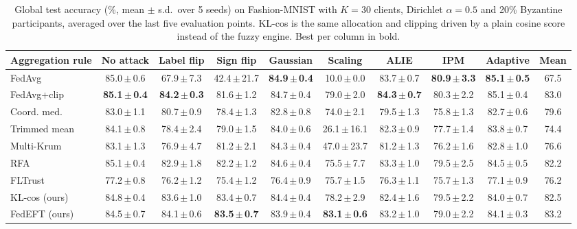 \begin{table}[!t]
\centering
\caption{Global test accuracy (\%, mean $\pm$ s.d.\ over 5 seeds) on Fashion-MNIST with $K=30$ clients, Dirichlet $\alpha=0.5$ and 20\% Byzantine participants, averaged over the last five evaluation points. KL-cos is the same allocation and clipping driven by a plain cosine score instead of the fuzzy engine. Best per column in bold.}
\label{tab:main_fmnist}
\setlength{\tabcolsep}{3.4pt}
\footnotesize
\begin{tabular}{lccccccccc}
\hline
Aggregation rule & No attack & Label flip & Sign flip & Gaussian & Scaling & ALIE & IPM & Adaptive & \textbf{Mean} \\
\hline
FedAvg & 85.0\,$\pm$\,0.6 & 67.9\,$\pm$\,7.3 & 42.4\,$\pm$\,21.7 & \textbf{84.9\,$\pm$\,0.4} & 10.0\,$\pm$\,0.0 & 83.7\,$\pm$\,0.7 & \textbf{80.9\,$\pm$\,3.3} & \textbf{85.1\,$\pm$\,0.5} & 67.5 \\
FedAvg+clip & \textbf{85.1\,$\pm$\,0.4} & \textbf{84.2\,$\pm$\,0.3} & 81.6\,$\pm$\,1.2 & 84.7\,$\pm$\,0.4 & 79.0\,$\pm$\,2.0 & \textbf{84.3\,$\pm$\,0.7} & 80.3\,$\pm$\,2.2 & 85.1\,$\pm$\,0.4 & 83.0 \\
Coord. med. & 83.0\,$\pm$\,1.1 & 80.7\,$\pm$\,0.9 & 78.4\,$\pm$\,1.3 & 82.8\,$\pm$\,0.8 & 74.0\,$\pm$\,2.1 & 79.5\,$\pm$\,1.3 & 75.8\,$\pm$\,1.3 & 82.7\,$\pm$\,0.6 & 79.6 \\
Trimmed mean & 84.1\,$\pm$\,0.8 & 78.4\,$\pm$\,2.4 & 79.0\,$\pm$\,1.5 & 84.0\,$\pm$\,0.6 & 26.1\,$\pm$\,16.1 & 82.3\,$\pm$\,0.9 & 77.7\,$\pm$\,1.4 & 83.8\,$\pm$\,0.7 & 74.4 \\
Multi-Krum & 83.1\,$\pm$\,1.3 & 76.9\,$\pm$\,4.7 & 81.2\,$\pm$\,2.1 & 84.3\,$\pm$\,0.4 & 47.0\,$\pm$\,23.7 & 81.2\,$\pm$\,1.3 & 76.2\,$\pm$\,1.6 & 82.8\,$\pm$\,1.0 & 76.6 \\
RFA & 85.1\,$\pm$\,0.4 & 82.9\,$\pm$\,1.8 & 82.2\,$\pm$\,1.2 & 84.6\,$\pm$\,0.4 & 75.5\,$\pm$\,7.7 & 83.3\,$\pm$\,1.0 & 79.5\,$\pm$\,2.5 & 84.5\,$\pm$\,0.5 & 82.2 \\
FLTrust & 77.2\,$\pm$\,0.8 & 76.2\,$\pm$\,1.2 & 75.4\,$\pm$\,1.2 & 76.4\,$\pm$\,0.9 & 75.7\,$\pm$\,1.5 & 76.3\,$\pm$\,1.1 & 75.7\,$\pm$\,1.3 & 77.1\,$\pm$\,0.9 & 76.2 \\
\hline
KL-cos (ours) & 84.8\,$\pm$\,0.4 & 83.6\,$\pm$\,1.0 & 83.4\,$\pm$\,0.7 & 84.4\,$\pm$\,0.4 & 78.2\,$\pm$\,2.9 & 82.4\,$\pm$\,1.6 & 79.5\,$\pm$\,2.2 & 84.0\,$\pm$\,0.7 & 82.5 \\
\hline
FedEFT (ours) & 84.5\,$\pm$\,0.7 & 84.1\,$\pm$\,0.6 & \textbf{83.5\,$\pm$\,0.7} & 83.9\,$\pm$\,0.4 & \textbf{83.1\,$\pm$\,0.6} & 83.2\,$\pm$\,1.0 & 79.0\,$\pm$\,2.2 & 84.1\,$\pm$\,0.3 & 83.2 \\
\hline
\end{tabular}
\end{table}
